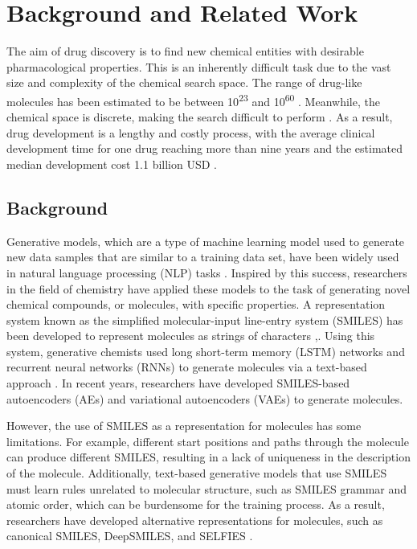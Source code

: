 \chapter{Background and Related Work}
The aim of drug discovery is to find new chemical entities with desirable pharmacological properties. This is an inherently difficult task due to the vast size and complexity of the chemical search space. The range of drug-like molecules has been estimated to be between 10\textsuperscript{23} and 10\textsuperscript{60} \cite{polishchuk2013estimation}. Meanwhile, the chemical space is discrete, making the search difficult to perform \cite{kirkpatrick2004chemical}. As a result, drug development is a lengthy and costly process, with the average clinical development time for one drug reaching more than nine years and the estimated median development cost 1.1 billion USD \cite{wouters2020estimated}.

\section{Background}
Generative models, which are a type of machine learning model used to generate new data samples that are similar to a training data set, have been widely used in natural language processing (NLP) tasks \cite{shorten2021text}. Inspired by this success, researchers in the field of chemistry have applied these models to the task of generating novel chemical compounds, or molecules, with specific properties. A representation system known as the simplified molecular-input line-entry system (SMILES) has been developed to represent molecules as strings of characters \cite{meyers2021novo},\cite{weininger1988smiles}. Using this system, generative chemists used long short-term memory (LSTM) networks and recurrent neural networks (RNNs) to generate molecules via a text-based approach \cite{gupta2018generative}. In recent years, researchers have developed SMILES-based autoencoders (AEs) and variational autoencoders (VAEs) to generate molecules.

 However, the use of SMILES as a representation for molecules has some limitations. For example, different start positions and paths through the molecule can produce different SMILES, resulting in a lack of uniqueness in the description of the molecule\cite{meyers2021novo, sousa2021generative, lee2022mgcvae, li2018multi}. Additionally, text-based generative models that use SMILES must learn rules unrelated to molecular structure, such as SMILES grammar and atomic order, which can be burdensome for the training process. As a result, researchers have developed alternative representations for molecules, such as canonical SMILES, DeepSMILES, and SELFIES \cite{o2012towards,o2018deepsmiles, krenn2020self}.

